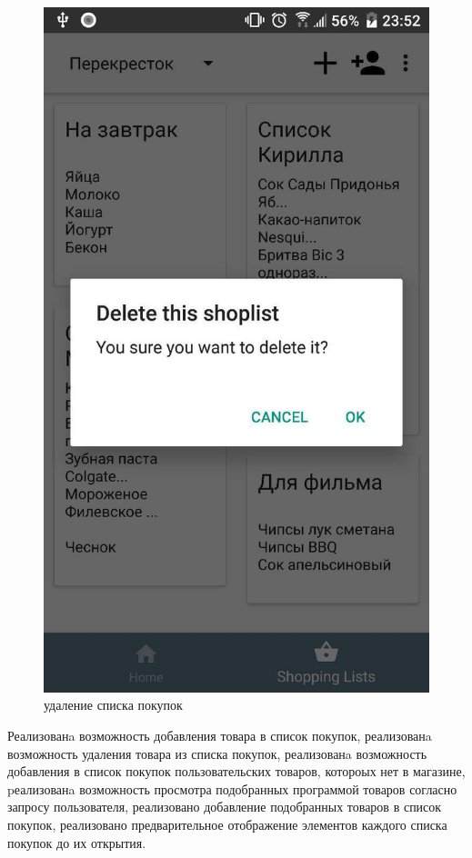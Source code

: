 \begin{figure}[h!]
    \includegraphics[height=0.38\textheight]{./screenshots/3/delete_shoplist.jpg}
    \caption{\small{удаление списка покупок}}
    \endminipage{}
\end{figure}

Реализованa возможность добавления товара в список покупок, реализованa возможность удаления товара из
списка покупок, реализованa возможность добавления в список покупок
пользовательских товаров, котороых нет в магазине, pеализованa возможность
просмотра подобранных программой товаров согласно запросу пользователя,
реализовано добавление подобранных товаров в список покупок, реализовано
предварительное отображение элементов каждого списка покупок до их открытия.

